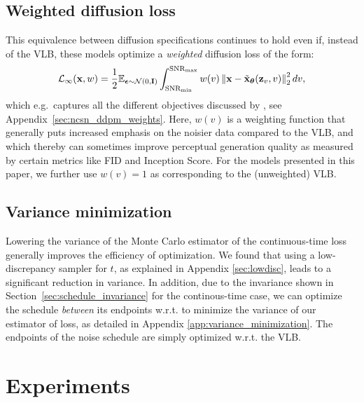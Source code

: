 \documentclass{article}
\newcommand{\snr}{\text{SNR}}
\begin{document}
\subsection{Weighted diffusion loss}
This equivalence between diffusion specifications continues to hold even if, instead of the VLB, these models optimize a \emph{weighted} diffusion loss of the form:
\begin{align}
\mathcal{L}_{\infty}(\rvx, w) = \frac{1}{2}\E_{\bepsilon\sim\mathcal{N}(0,\bfI)} \int_{\snr_{\text{min}}}^{\snr_{\text{max}}} w(v) \left\rVert \rvx - \tilde{\rvx}_{\bT}(\rvz_v, v) \right\lVert_{2}^{2} dv,
\label{eq:weighted_diff}
\end{align}
which e.g.\ captures all the different objectives discussed by \cite{song2020score}, see Appendix~\ref{sec:ncsn_ddpm_weights}. Here, $w(v)$ is a weighting function that generally puts increased emphasis on the noisier data compared to the VLB, and which thereby can sometimes improve perceptual generation quality as measured by certain metrics like FID and Inception Score. For the models presented in this paper, we further use $w(v)=1$ as corresponding to the (unweighted) VLB. 

%
%

%

%
%
%

%
%
%
%
%
%
%
%
%
%
%

%

%

%


\subsection{Variance minimization}

Lowering the variance of the Monte Carlo estimator of the continuous-time loss generally improves the efficiency of optimization. We found that using a low-discrepancy sampler for $t$, as explained in Appendix \ref{sec:lowdisc}, leads to a significant reduction in variance. In addition, due to the invariance shown in Section~\ref{sec:schedule_invariance} for the continous-time case, we can optimize the schedule \emph{between} its endpoints w.r.t. to minimize the variance of our estimator of loss, as detailed in Appendix \ref{app:variance_minimization}. The endpoints of the noise schedule are simply optimized w.r.t. the VLB. 

\section{Experiments}
\label{sec:experiments}
\end{document}
